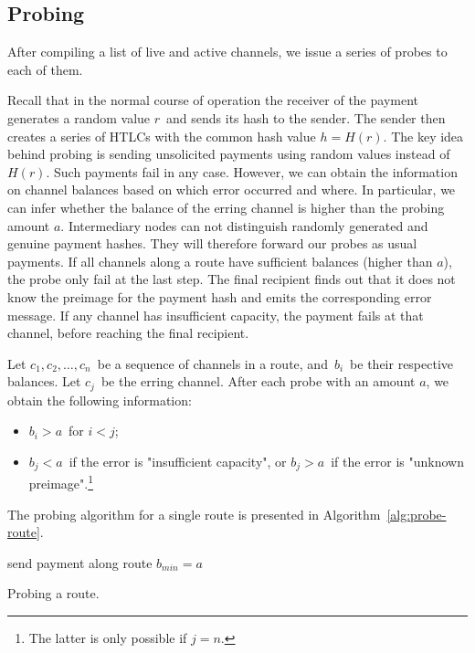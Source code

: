 \subsection{Probing}

After compiling a list of live and active channels, we issue a series of probes to each of them.

Recall that in the normal course of operation the receiver of the payment generates a random value $r$~and sends its hash to the sender.
The sender then creates a series of HTLCs with the common hash value $h = H(r)$.
The key idea behind probing is sending unsolicited payments using random values instead of~$H(r)$.
Such payments fail in any case.
However, we can obtain the information on channel balances based on which error occurred and where.
In particular, we can infer whether the balance of the erring channel is higher than the probing amount $a$.
Intermediary nodes can not distinguish randomly generated and genuine payment hashes.
They will therefore forward our probes as usual payments.
If all channels along a route have sufficient balances (higher than $a$), the probe only fail at the last step.
The final recipient finds out that it does not know the preimage for the payment hash and emits the corresponding error message.
If any channel has insufficient capacity, the payment fails at that channel, before reaching the final recipient.

Let $c_1, c_2, \dots, c_n$~be a sequence of channels in a route, and~$b_i$~be their respective balances.
Let $c_j$~be the erring channel.
After each probe with an amount $a$, we obtain the following information:
\begin{itemize}
	\item $b_i > a$~for $i<j$;
	\item $b_j < a$~if the error is "insufficient capacity", or $b_j > a$~if the error is "unknown preimage".\footnote{The latter is only possible if $j=n$.}
\end{itemize}

The probing algorithm for a single route is presented in Algorithm~\ref{alg:probe-route}.

\begin{algorithm}
	send payment along route\;
	 {
		$b_{min} = a$\;
	}
	\caption{Probing a route.}
	\label{alg:probe-route}
\end{algorithm}


